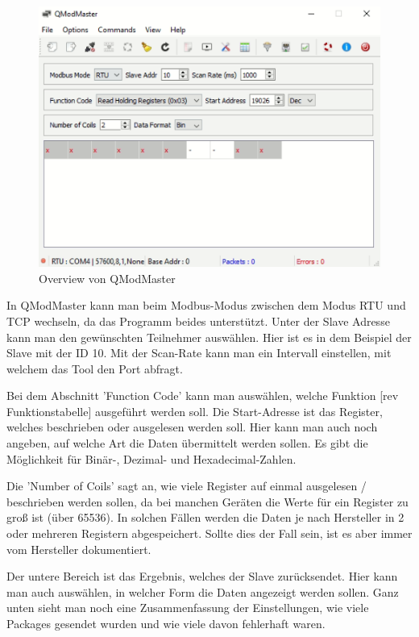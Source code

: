 \begin{figure}[h t] 
    \centering
    \includegraphics[scale=0.7]{pics/QmodMasterverview.png}
    \caption{Overview von QModMaster }
    \label{fig:impl:QmodMasterverview}
\end{figure}


In QModMaster kann man beim Modbus-Modus zwischen dem Modus RTU und TCP wechseln, da das Programm beides unterstützt. Unter der Slave Adresse kann man den gewünschten Teilnehmer auswählen. Hier ist es in dem Beispiel der Slave mit der ID 10. Mit der Scan-Rate kann man ein Intervall einstellen, mit welchem das Tool den Port abfragt.   

Bei dem Abschnitt 'Function Code' kann man auswählen, welche Funktion [rev Funktionstabelle] ausgeführt werden soll. Die Start-Adresse ist das Register, welches beschrieben oder ausgelesen werden soll. Hier kann man auch noch angeben, auf welche Art die Daten übermittelt werden sollen. Es gibt die Möglichkeit für Binär-, Dezimal- und Hexadecimal-Zahlen. 

Die 'Number of Coils' sagt an, wie viele Register auf einmal ausgelesen / beschrieben werden sollen, da bei manchen Geräten die Werte für ein Register zu groß ist (über 65536). In solchen Fällen werden die Daten je nach Hersteller in 2 oder mehreren Registern abgespeichert. Sollte dies der Fall sein, ist es aber immer vom Hersteller dokumentiert.   

Der untere Bereich ist das Ergebnis, welches der Slave zurücksendet. Hier kann man auch auswählen, in welcher Form die Daten angezeigt werden sollen. Ganz unten sieht man noch eine Zusammenfassung der Einstellungen, wie viele Packages gesendet wurden und wie viele davon fehlerhaft waren.   

